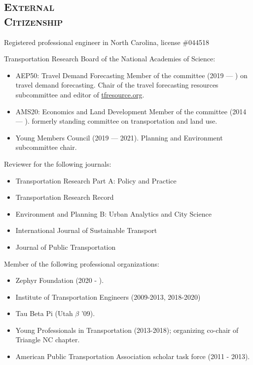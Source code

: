 \documentclass[margin,line]{res}
\newcommand{\secfont}{\scshape }
\begin{document}
\begin{resume}
\noindent\makebox[\linewidth]{\rule{\linewidth}{0.4pt}}
\section{\secfont External \\ Citizenship}

Registered professional engineer in North Carolina, license \#044518

Transportation Research Board of the National Academies of Science:

\begin{itemize}
  \item AEP50: Travel Demand Forecasting Member of the committee (2019 --- ) on
  travel demand forecasting. Chair of the travel forecasting resources
  subcommittee and editor of \url{tfresource.org}.
  \item AMS20: Economics and Land Development Member of the committee (2014
  --- ). formerly standing committee on transportation and land use.
  \item Young Members Council (2019 --- 2021). Planning and Environment subcommittee
  chair.
\end{itemize}


Reviewer for the following journals:

\begin{itemize}
  \item Transportation Research Part A: Policy and Practice
  \item Transportation Research Record
  \item Environment and Planning B: Urban Analytics and City Science
  \item International Journal of Sustainable Transport
  \item Journal of Public Transportation
\end{itemize}

Member of the following professional organizations:

\begin{itemize}
  \item Zephyr Foundation (2020 - ).
  \item Institute of Transportation Engineers (2009-2013, 2018-2020)
  \item Tau Beta Pi (Utah $\beta$ '09).
  \item Young Professionals in Transportation (2013-2018); organizing co-chair of
Triangle NC chapter.
  \item American Public Transportation Association scholar task force (2011 - 2013).
\end{itemize}


\end{resume}
\end{document}
